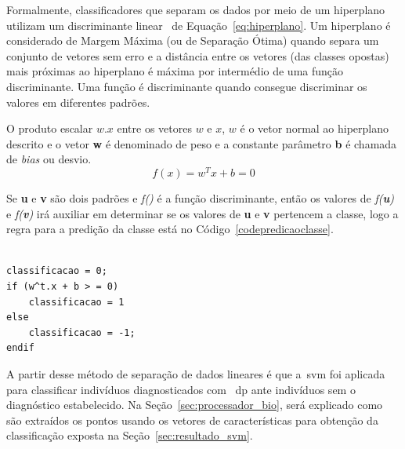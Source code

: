 Formalmente, classificadores que separam os dados por meio de um hiperplano utilizam um discriminante linear~\cite{valt2010} de Equação~\ref{eq:hiperplano}. Um hiperplano é considerado de Margem Máxima (ou de Separação Ótima) quando separa um conjunto de vetores sem erro e a distância entre os vetores (das classes opostas) mais próximas ao hiperplano é máxima por intermédio de uma função discriminante. Uma função é discriminante quando consegue discriminar os valores em diferentes padrões. 

O produto escalar $ w.x $ entre os vetores $ w $ e $ x $, $ w $ é o vetor normal ao hiperplano descrito e o vetor \textbf{w} é denominado de peso e a constante parâmetro \textbf{b} é chamada de \textit{bias} ou desvio.
\linebreak
\begin{equation}
f(x)=w^Tx+b=0
\label{eq:hiperplano}
\end{equation}

Se \textbf{u} e \textbf{v} são dois padrões e \textit{f()} é a função discriminante, então os valores de \textit{f(\textbf{u})} e \textit{f(\textbf{v})} irá auxiliar em determinar se os valores de \textbf{u} e \textbf{v} pertencem a classe, logo a regra para a predição da classe está no Código~\ref{codepredicaoclasse}. 

\begin{lstlisting}[frame=single, caption=Código de Predição da Classes, label=codepredicaoclasse]  % Start your code-block

classificacao = 0;
if (w^t.x + b > = 0)
	classificacao = 1
else
	classificacao = -1;
endif
\end{lstlisting}
A partir desse método de separação de dados lineares é que a~\ac{svm} foi aplicada para classificar indivíduos diagnosticados com ~\ac{dp} ante indivíduos sem o diagnóstico estabelecido. Na Seção~\ref{sec:processador_bio}, será explicado como são extraídos os pontos usando os vetores de características para obtenção da classificação exposta na Seção~\ref{sec:resultado_svm}.

